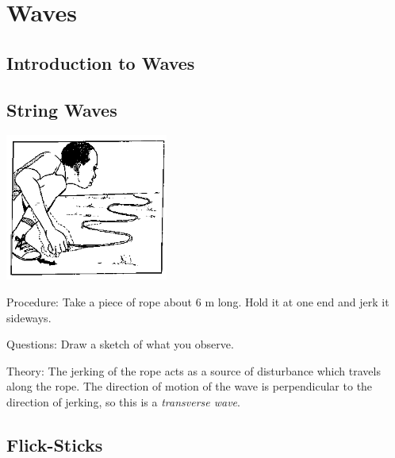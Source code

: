 \section{Waves}

\begin{multicols}{2}


\section*{Introduction to Waves}


\subsection{String Waves}

\begin{center}
\includegraphics[width=0.4\textwidth]{./img/source/string-waves.png}
\end{center}

\begin{description*}
\item[Procedure:]{Take a piece of rope about 6 m long. Hold it at one end and jerk it sideways.}
\item[Questions:]{Draw a sketch of what you observe.}
\item[Theory:]{The jerking of the rope acts as a source of disturbance which travels along the rope. The direction of motion of the wave is perpendicular to the direction of jerking, so this is a \emph{transverse wave}.}
\end{description*}

\subsection{Flick-Sticks}


\end{multicols}
